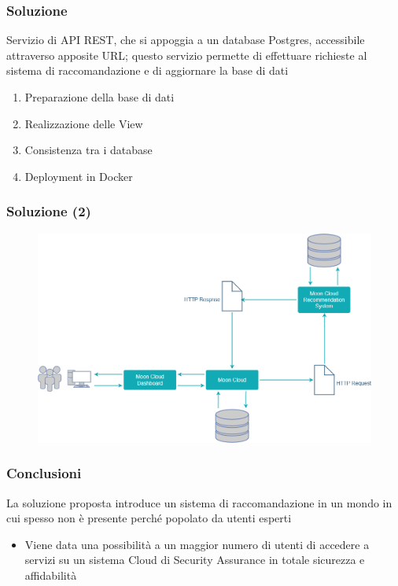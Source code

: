 \begin{frame}
    \frametitle{Soluzione}
    Servizio di \alert{API REST}, che si appoggia a un database Postgres, accessibile 
    attraverso apposite URL; questo servizio permette di effettuare richieste al sistema di raccomandazione e di aggiornare la base di dati
    \begin{enumerate}
        \item Preparazione della base di dati
        \item Realizzazione delle View
        \item Consistenza tra i database
        \item Deployment in Docker
    \end{enumerate}
\end{frame}

\begin{frame}
    \frametitle{Soluzione (2)}
    \begin{figure}
        \centering
        \includegraphics[scale=0.42]{images/UML_MoonCloud_HowToDo}
    \end{figure}
\end{frame}

\begin{frame}
    \frametitle{Conclusioni}
    La soluzione proposta introduce un sistema di raccomandazione in un mondo in cui spesso non è presente perché 
    popolato da utenti esperti
    \begin{itemize}
        \item Viene data una possibilità a un \alert{maggior numero di utenti} di accedere a servizi su un sistema Cloud di 
        Security Assurance in totale sicurezza e affidabilità
    \end{itemize}
\end{frame}



